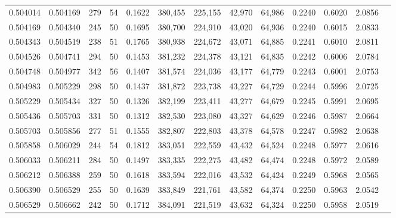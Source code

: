 \begin{tabular}{rrrrrrrrrrrrr}
0.504014 & 0.504169 &   279 &  54 &                                     0.1622 & 380,455 & 225,155 &  42,970 &  64,986 & 0.2240 & 0.6020 & 2.0856 \\
0.504169 & 0.504340 &   245 &  50 &                                     0.1695 & 380,700 & 224,910 &  43,020 &  64,936 & 0.2240 & 0.6015 & 2.0833 \\
0.504343 & 0.504519 &   238 &  51 &                                     0.1765 & 380,938 & 224,672 &  43,071 &  64,885 & 0.2241 & 0.6010 & 2.0811 \\
0.504526 & 0.504741 &   294 &  50 &                                     0.1453 & 381,232 & 224,378 &  43,121 &  64,835 & 0.2242 & 0.6006 & 2.0784 \\
0.504748 & 0.504977 &   342 &  56 &                                     0.1407 & 381,574 & 224,036 &  43,177 &  64,779 & 0.2243 & 0.6001 & 2.0753 \\
0.504983 & 0.505229 &   298 &  50 &                                     0.1437 & 381,872 & 223,738 &  43,227 &  64,729 & 0.2244 & 0.5996 & 2.0725 \\
0.505229 & 0.505434 &   327 &  50 &                                     0.1326 & 382,199 & 223,411 &  43,277 &  64,679 & 0.2245 & 0.5991 & 2.0695 \\
0.505436 & 0.505703 &   331 &  50 &                                     0.1312 & 382,530 & 223,080 &  43,327 &  64,629 & 0.2246 & 0.5987 & 2.0664 \\
0.505703 & 0.505856 &   277 &  51 &                                     0.1555 & 382,807 & 222,803 &  43,378 &  64,578 & 0.2247 & 0.5982 & 2.0638 \\
0.505858 & 0.506029 &   244 &  54 &                                     0.1812 & 383,051 & 222,559 &  43,432 &  64,524 & 0.2248 & 0.5977 & 2.0616 \\
0.506033 & 0.506211 &   284 &  50 &                                     0.1497 & 383,335 & 222,275 &  43,482 &  64,474 & 0.2248 & 0.5972 & 2.0589 \\
0.506212 & 0.506388 &   259 &  50 &                                     0.1618 & 383,594 & 222,016 &  43,532 &  64,424 & 0.2249 & 0.5968 & 2.0565 \\
0.506390 & 0.506529 &   255 &  50 &                                     0.1639 & 383,849 & 221,761 &  43,582 &  64,374 & 0.2250 & 0.5963 & 2.0542 \\
0.506529 & 0.506662 &   242 &  50 &                                     0.1712 & 384,091 & 221,519 &  43,632 &  64,324 & 0.2250 & 0.5958 & 2.0519 \\

\end{tabular}
